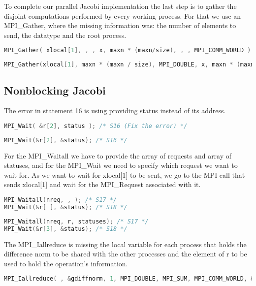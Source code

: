 \documentclass[a4paper, 10pt]{article}
\begin{document}
To complete our parallel Jacobi implementation the last step is to gather the disjoint computations performed by every working process. For that we use an MPI\_Gather, where the missing information was: the number of elements to send, the datatype and the root process.
    \begin{lstlisting}[language=c, caption={Template }]
MPI_Gather( xlocal[1], , , x, maxn * (maxn/size), , , MPI_COMM_WORLD ); /* S15 */
    \end{lstlisting}

    \begin{lstlisting}[language=c, caption={Correct }]
MPI_Gather(xlocal[1], maxn * (maxn / size), MPI_DOUBLE, x, maxn * (maxn / size), MPI_DOUBLE, 0, MPI_COMM_WORLD); /* S15 */
    \end{lstlisting}

\subsection{Nonblocking Jacobi}

The error in statement 16 is using providing status instead of its address.
    \begin{lstlisting}[language=c, caption={Template S16}]
MPI_Wait( &r[2], status ); /* S16 (Fix the error) */
    \end{lstlisting}

    \begin{lstlisting}[language=c, caption={Correct S16}]
MPI_Wait(&r[2], &status); /* S16 */
    \end{lstlisting}

For the MPI\_Waitall we have to provide the array of requests and array of statuses, and for the MPI\_Wait we need to specify which request we want to wait for. As we want to wait for xlocal[1] to be sent, we go to the MPI call that sends xlocal[1] and wait for the MPI\_Request associated with it. 
    \begin{lstlisting}[language=c, caption={Template S17, S18}]
MPI_Waitall(nreq, , ); /* S17 */
MPI_Wait(&r[ ], &status); /* S18 */
    \end{lstlisting}

    \begin{lstlisting}[language=c, caption={Correct S17, S18}]
MPI_Waitall(nreq, r, statuses); /* S17 */
MPI_Wait(&r[3], &status); /* S18 */
    \end{lstlisting}

The MPI\_Iallreduce is missing the local variable for each process that holds the difference norm to be shared with the other processes and the element of r to be used to hold the operation's information.
    \begin{lstlisting}[language=c, caption={Template S19}]
MPI_Iallreduce( , &gdiffnorm, 1, MPI_DOUBLE, MPI_SUM, MPI_COMM_WORLD, &r[ ]); /* S19 */
    \end{lstlisting}
\end{document}
